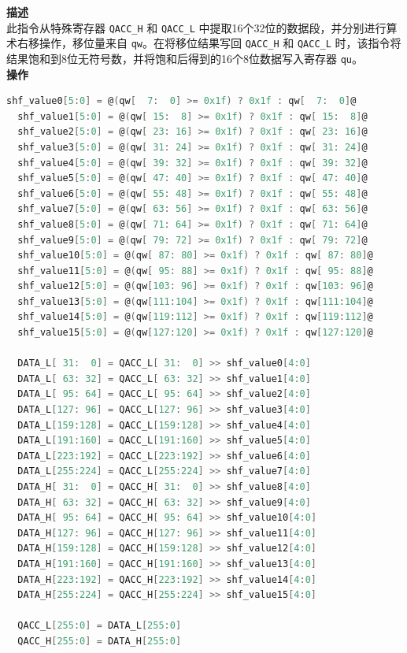 \textbf{描述}\\
此指令从特殊寄存器 \lstinline{QACC_H} 和 \lstinline{QACC_L} 中提取16个32位的数据段，并分别进行算术右移操作，移位量来自 \lstinline{qw}。在将移位结果写回 \lstinline{QACC_H} 和 \lstinline{QACC_L} 时，该指令将结果饱和到8位无符号数，并将饱和后得到的16个8位数据写入寄存器 \lstinline{qu}。\\

\textbf{操作}

\begin{lstlisting}[language=C, escapechar=@]
  shf_value0[5:0] = @(qw[  7:  0] >= 0x1f) ? 0x1f : qw[  7:  0]@
  shf_value1[5:0] = @(qw[ 15:  8] >= 0x1f) ? 0x1f : qw[ 15:  8]@
  shf_value2[5:0] = @(qw[ 23: 16] >= 0x1f) ? 0x1f : qw[ 23: 16]@
  shf_value3[5:0] = @(qw[ 31: 24] >= 0x1f) ? 0x1f : qw[ 31: 24]@
  shf_value4[5:0] = @(qw[ 39: 32] >= 0x1f) ? 0x1f : qw[ 39: 32]@
  shf_value5[5:0] = @(qw[ 47: 40] >= 0x1f) ? 0x1f : qw[ 47: 40]@
  shf_value6[5:0] = @(qw[ 55: 48] >= 0x1f) ? 0x1f : qw[ 55: 48]@
  shf_value7[5:0] = @(qw[ 63: 56] >= 0x1f) ? 0x1f : qw[ 63: 56]@
  shf_value8[5:0] = @(qw[ 71: 64] >= 0x1f) ? 0x1f : qw[ 71: 64]@
  shf_value9[5:0] = @(qw[ 79: 72] >= 0x1f) ? 0x1f : qw[ 79: 72]@
  shf_value10[5:0] = @(qw[ 87: 80] >= 0x1f) ? 0x1f : qw[ 87: 80]@
  shf_value11[5:0] = @(qw[ 95: 88] >= 0x1f) ? 0x1f : qw[ 95: 88]@
  shf_value12[5:0] = @(qw[103: 96] >= 0x1f) ? 0x1f : qw[103: 96]@
  shf_value13[5:0] = @(qw[111:104] >= 0x1f) ? 0x1f : qw[111:104]@
  shf_value14[5:0] = @(qw[119:112] >= 0x1f) ? 0x1f : qw[119:112]@
  shf_value15[5:0] = @(qw[127:120] >= 0x1f) ? 0x1f : qw[127:120]@

  DATA_L[ 31:  0] = QACC_L[ 31:  0] >> shf_value0[4:0]
  DATA_L[ 63: 32] = QACC_L[ 63: 32] >> shf_value1[4:0]
  DATA_L[ 95: 64] = QACC_L[ 95: 64] >> shf_value2[4:0]
  DATA_L[127: 96] = QACC_L[127: 96] >> shf_value3[4:0]
  DATA_L[159:128] = QACC_L[159:128] >> shf_value4[4:0]
  DATA_L[191:160] = QACC_L[191:160] >> shf_value5[4:0]
  DATA_L[223:192] = QACC_L[223:192] >> shf_value6[4:0]
  DATA_L[255:224] = QACC_L[255:224] >> shf_value7[4:0]
  DATA_H[ 31:  0] = QACC_H[ 31:  0] >> shf_value8[4:0]
  DATA_H[ 63: 32] = QACC_H[ 63: 32] >> shf_value9[4:0]
  DATA_H[ 95: 64] = QACC_H[ 95: 64] >> shf_value10[4:0]
  DATA_H[127: 96] = QACC_H[127: 96] >> shf_value11[4:0]
  DATA_H[159:128] = QACC_H[159:128] >> shf_value12[4:0]
  DATA_H[191:160] = QACC_H[191:160] >> shf_value13[4:0]
  DATA_H[223:192] = QACC_H[223:192] >> shf_value14[4:0]
  DATA_H[255:224] = QACC_H[255:224] >> shf_value15[4:0]

  QACC_L[255:0] = DATA_L[255:0]
  QACC_H[255:0] = DATA_H[255:0]


\end{lstlisting}
